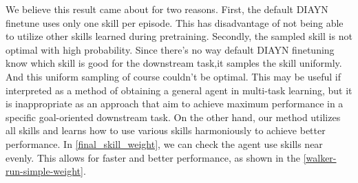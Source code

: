 We believe this result came about for two reasons.
First, the default DIAYN finetune uses only one skill per episode.
This has disadvantage of not being able to utilize other skills learned during pretraining.
Secondly, the sampled skill is not optimal with high probability.
Since there's no way default DIAYN finetuning know which skill is good for the downstream task,it samples the skill uniformly.
And this uniform sampling of course couldn't be optimal.
This may be useful if interpreted as a method of obtaining a general agent in multi-task learning,
but it is inappropriate as an approach that aim to achieve maximum performance in a specific goal-oriented downstream task.
On the other hand, our method utilizes all skills and learns how to use various skills harmoniously to achieve better performance.
In \cref*{final_skill_weight}, we can check the agent use skills near evenly.
This allows for faster and better performance, as shown in the \cref{walker-run-simple-weight}.



